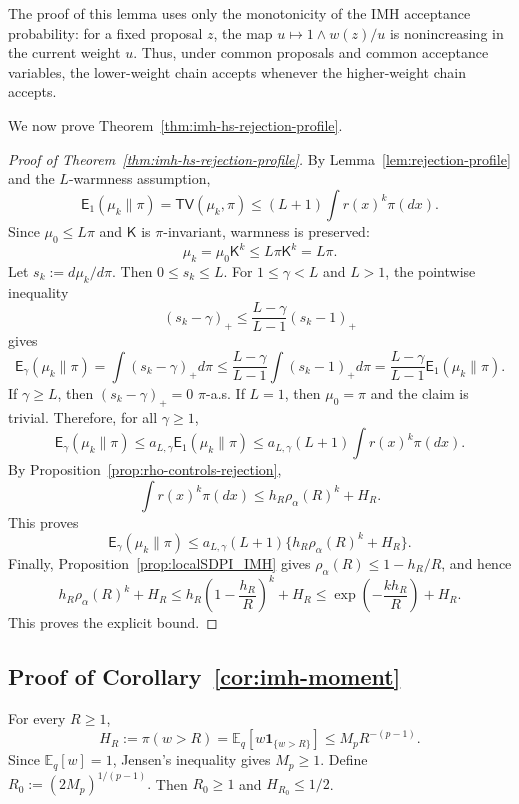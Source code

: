 \documentclass[10pt, journal]{IEEEtran}
\newcommand{\sK}{\mathsf{K}}
\begin{document}
The proof of this lemma uses only the monotonicity of the IMH acceptance probability: for a fixed proposal $z$, the map $u\mapsto 1\wedge w(z)/u$ is nonincreasing in the current weight $u$. Thus, under common proposals and common acceptance variables, the lower-weight chain accepts whenever the higher-weight chain accepts.

We now prove Theorem~\ref{thm:imh-hs-rejection-profile}.

\begin{proof}[Proof of Theorem~\ref{thm:imh-hs-rejection-profile}]
By Lemma~\ref{lem:rejection-profile} and the $L$-warmness assumption,
$$\mathsf E_1(\mu_k\|\pi)=\mathsf{TV}(\mu_k,\pi)\le (L+1)\int r(x)^k\pi(dx).$$
Since $\mu_0\le L\pi$ and $\sK$ is $\pi$-invariant, warmness is preserved:
$$\mu_k=\mu_0\sK^k\le L\pi\sK^k=L\pi.$$
Let $s_k:=d\mu_k/d\pi$. Then $0\le s_k\le L$. For $1\le\gamma<L$ and $L>1$, the pointwise inequality
$$ (s_k-\gamma)_+\le \frac{L-\gamma}{L-1}(s_k-1)_+ $$
gives
$$\mathsf E_\gamma(\mu_k\|\pi)=\int(s_k-\gamma)_+d\pi\le \frac{L-\gamma}{L-1}\int(s_k-1)_+d\pi=\frac{L-\gamma}{L-1}\mathsf E_1(\mu_k\|\pi).$$
If $\gamma\ge L$, then $(s_k-\gamma)_+=0$ $\pi$-a.s. If $L=1$, then $\mu_0=\pi$ and the claim is trivial. Therefore, for all $\gamma\ge1$,
$$\mathsf E_\gamma(\mu_k\|\pi)\le a_{L,\gamma}\mathsf E_1(\mu_k\|\pi)\le a_{L,\gamma}(L+1)\int r(x)^k\pi(dx).$$
By Proposition~\ref{prop:rho-controls-rejection},
$$\int r(x)^k\pi(dx)\le h_R\rho_\alpha(R)^k+H_R.$$
This proves
$$\mathsf E_\gamma(\mu_k\|\pi)\le a_{L,\gamma}(L+1)\{h_R\rho_\alpha(R)^k+H_R\}.$$
Finally, Proposition~\ref{prop:localSDPI_IMH} gives $\rho_\alpha(R)\le 1-h_R/R$, and hence
$$h_R\rho_\alpha(R)^k+H_R\le h_R\left(1-\frac{h_R}{R}\right)^k+H_R\le \exp\left(-\frac{kh_R}{R}\right)+H_R.$$
This proves the explicit bound.
\end{proof}

\subsection{Proof of Corollary~\ref{cor:imh-moment}} \label{app:proofCor:imh-moment}
For every $R\ge 1$,
$$H_R:=\pi(w>R)=\mathbb E_q[w\mathbf 1_{\{w>R\}}]\le M_pR^{-(p-1)}.$$
Since $\mathbb E_q[w]=1$, Jensen's inequality gives $M_p\ge1$. Define $R_0:=(2M_p)^{1/(p-1)}.$
Then $R_0\ge1$ and $H_{R_0}\le1/2$.
\end{document}
